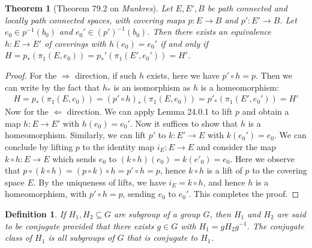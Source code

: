 \documentclass[11pt]{book}
\theoremstyle{break}
\theoremstyle{break}
\newtheorem{thm}{Theorem}[section]
\newtheorem{defn}{Definition}[corL]
\begin{document}
\newpage
\begin{thm}[Theorem 79.2 on \textit{Munkres}]
Let $E,E',B$ be path connected and locally path connected spaces, with covering maps $p:E\to B$ and $p':E' \to B$. Let $e_0 \in p^{-1}(b_0)$ and $e_0' \in (p')^{-1}(b_0)$. Then there exists an equivalence $h:E \to E'$ of coverings with $h(e_0) = e_0'$ if and only if $H = p_*(\pi_1(E,e_0)) = p_*'(\pi_1(E',e_0')) = H'$. 
\end{thm}
\begin{proof}
For the $\Rightarrow$ direction, if such $h $ exists, here we have $p'\circ h =p$. Then we can write by the fact that $h_*$ is an isomorphism as $h $ is a homeomorphism:
\begin{align*}
H = p_*(\pi_1(E,e_0)) = (p'\circ h)_*(\pi_1(E,e_0)) = p'_*(\pi_1(E',e_0'))= H'
\end{align*} 
Now for the $\Leftarrow$ direction. We can apply Lemma 24.0.1 to lift $p$ and obtain a map $h:E \to E'$ with $h(e_0) = e_0'$. Now it suffices to show that $h$ is a homeomorphism. Similarly, we can lift $p'$ to $k:E' \to E$ with $k(e_0') = e_0$. We can conclude by lifting $p$ to the identity map $i_E:E \to E$ and consider the map $k\circ h :E \to E$ which sends $e_0$ to $(k\circ h)(e_0) = k(e'_0) = e_0$. Here we observe that $p\circ (k\circ h) = (p\circ k)\circ h = p'\circ h = p$, hence $k\circ h$ is a lift of $p$ to the covering space $E$. By the uniqueness of lifts, we have $i_E = k\circ h$, and hence $h$ is a homeomorphism, with $p'\circ h = p$, sending $e_0$ to $e_0'$. This completes the proof. 
\end{proof}


\begin{defn}
 If $H_1,H_2\subseteq G$ are subgroup of a group $G$, then $H_1$ and $H_2$ are said to be conjugate provided that there exists $g\in G$ with $H_1 = gH_2 g^{-1}$. The conjugate class of $H_1$ is all subgroups of $G$ that is conjugate to $H_1$. 
\end{defn}
\end{document}
